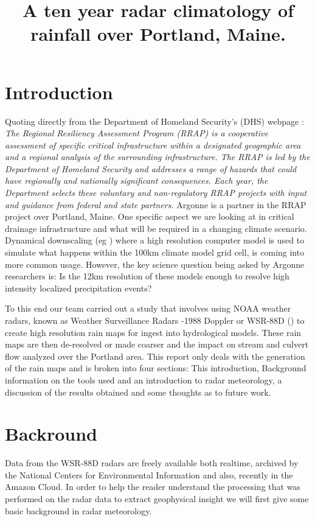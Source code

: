 \documentclass[twocol]{ametsoc}
\title{A ten year radar climatology of rainfall over Portland, Maine.}
\affiliation{Environmental Science Division, Argonne National Laboratory}
\begin{document}
\maketitle


\section{Introduction}
\label{sec:intro}
Quoting directly from the Department of Homeland Security's (DHS) webpage : \textit{The 
Regional Resiliency Assessment Program (RRAP) is a cooperative assessment of specific
 critical infrastructure within a designated geographic area and a regional analysis of the
surrounding infrastructure. The RRAP is led by the Department of Homeland Security
and addresses a range of hazards that could have regionally and nationally significant
 consequences. Each year, the Department selects these voluntary and non-regulatory 
RRAP projects with input and guidance from federal and state partners.} Argonne is a
partner in the RRAP project over Portland, Maine. One specific aspect we are looking
at in critical drainage infrastructure and what will be required in a changing climate
scenario. Dynamical downscaling (eg \cite{wang}) where a high resolution computer
 model is used to simulate what happens within the 100km climate model grid cell, 
 is coming into more common usage. However, the key science question being asked by
  Argonne researchers is: Is the 12km resolution of these models enough to resolve high intensity  
localized precipitation events?

To this end our team carried out a study that involves using NOAA weather radars, known as 
Weather Surveillance Radars -1988 Doppler or WSR-88D (\cite{crum_wsr-88d_1993}) to create high 
resolution rain maps for ingest into hydrological models. These rain maps are then de-resolved or made 
coarser and the impact on stream and culvert flow analyzed over the Portland area. This report only 
deals with the generation of the rain maps and is broken into four sections: This introduction, Background 
information on the tools used and an introduction to radar meteorology, a discussion of the results obtained 
and some thoughts as to future work.  

 
\section{Backround}
Data from the WSR-88D radars are freely available both realtime, archived by the National Centers for 
Environmental Information and also, recently in the Amazon Cloud. In order to help the reader understand
the processing that was performed on the radar data to extract geophysical insight we will first give some
basic background in radar meteorology. 
\end{document}
